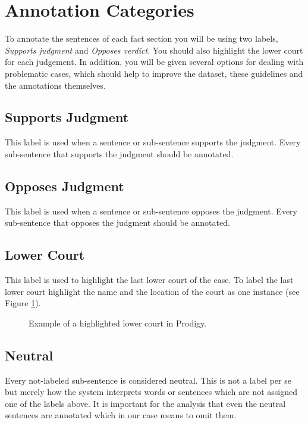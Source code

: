 \documentclass{article}
\begin{document}
\section{Annotation Categories}
To annotate the sentences of each fact section you will be using two labels,  \emph{Supports judgment} and \emph{Opposes verdict}. You should also highlight the lower court for each judgement. In addition, you will be given several options for dealing with problematic cases, which should help to improve the dataset, these guidelines and the annotations themselves.

\subsection{Supports Judgment}
This label is used when a sentence or sub-sentence supports the judgment. Every sub-sentence that supports the judgment should be annotated.

\subsection{Opposes Judgment}
This label is used when a sentence or sub-sentence opposes the judgment. Every sub-sentence that opposes the judgment should be annotated. 

\subsection{Lower Court}
This label is used to highlight the last lower court of the case. To label the last lower court highlight the name and the location of the court  as one instance (see Figure \ref{lower-court}).
\begin{figure}[H]
     \caption{Example of a highlighted lower court in Prodigy.}
     \label{lower-court}
\end{figure}


\subsection{Neutral}
Every not-labeled sub-sentence is considered neutral. This is not a label per se but merely how the system interprets words or sentences which are not assigned one of the labels above. It is important for the analysis that even the neutral sentences are annotated which in our case means to omit them.
\end{document}
